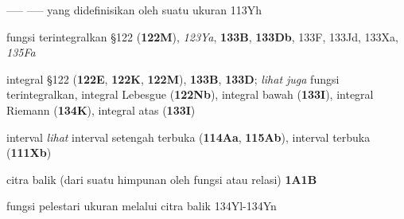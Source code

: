 ----- ----- yang didefinisikan oleh suatu ukuran 113Yh 





















fungsi terintegralkan \S122 ({\bf 122M}), {\it 123Ya}, {\bf 133B}, {\bf
133Db}, 133F, 133Jd, 133Xa, {\it 135Fa}

integral \S122 ({\bf 122E}, {\bf 122K}, {\bf 122M}), {\bf 133B}, {\bf
133D}; 
  {\it lihat juga}
fungsi terintegralkan, integral Lebesgue ({\bf 122Nb}),
integral bawah ({\bf 133I}), integral Riemann ({\bf 134K}), integral atas ({\bf 133I})


























interval
  {\it lihat}
interval setengah terbuka ({\bf 114Aa}, {\bf 115Ab}),
interval terbuka ({\bf 111Xb})





















 





citra balik (dari suatu himpunan oleh fungsi atau relasi) {\bf 1A1B}


fungsi pelestari ukuran melalui citra balik
134Yl-134Yn







